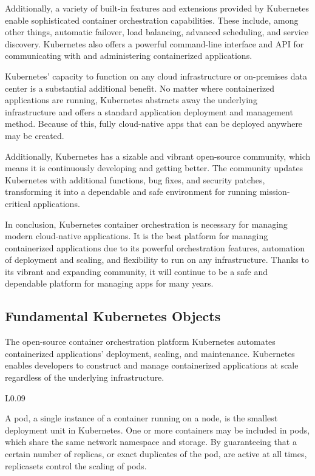 Additionally, a variety of built-in features and extensions provided by Kubernetes enable sophisticated container orchestration capabilities. These include, among other things, automatic failover, load balancing, advanced scheduling, and service discovery. Kubernetes also offers a powerful command-line interface and API for communicating with and administering containerized applications.

Kubernetes' capacity to function on any cloud infrastructure or on-premises data center is a substantial additional benefit. No matter where containerized applications are running, Kubernetes abstracts away the underlying infrastructure and offers a standard application deployment and management method. Because of this, fully cloud-native apps that can be deployed anywhere may be created.

Additionally, Kubernetes has a sizable and vibrant open-source community, which means it is continuously developing and getting better. The community updates Kubernetes with additional functions, bug fixes, and security patches, transforming it into a dependable and safe environment for running mission-critical applications.

In conclusion, Kubernetes container orchestration is necessary for managing modern cloud-native applications. It is the best platform for managing containerized applications due to its powerful orchestration features, automation of deployment and scaling, and flexibility to run on any infrastructure. Thanks to its vibrant and expanding community, it will continue to be a safe and dependable platform for managing apps for many years.


\subsection{Fundamental Kubernetes Objects}

The open-source container orchestration platform Kubernetes automates containerized applications' deployment, scaling, and maintenance. Kubernetes enables developers to construct and manage containerized applications at scale regardless of the underlying infrastructure.

\begin{wrapfigure}{L}{0.09\textwidth}
        
	  \label{fig:pod}
\end{wrapfigure}

A pod, a single instance of a container running on a node, is the smallest deployment unit in Kubernetes. One or more containers may be included in pods, which share the same network namespace and storage. By guaranteeing that a certain number of replicas, or exact duplicates of the pod, are active at all times, replicasets control the scaling of pods.


